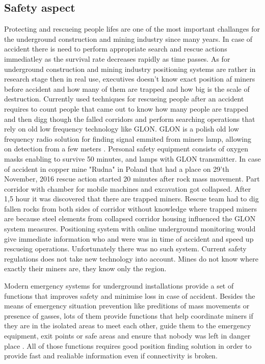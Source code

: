 \documentclass[../main.tex]{subfiles}
\begin{document}
\subsection{Safety aspect} %
\label{sub:safety_aspect}

Protecting and rescueing people lifes are one of the most important challanges for the underground construction and mining industry since many years. In case of accident there is need to perform appropriate search and rescue actions immediatley as the survival rate decreases rapidly as time passes. As for underground construction and mining industry positioning systems are rather in research stage then in real use, executives doesn't know exact position af miners before accident and how many of them are trapped and how big is the scale of destruction. Currently used techniques for rescueing people after an accident requires to count people that came out to know how many people are trapped and then digg though the falled corridors and perform searching operations that rely on old low frequency technology like GLON. GLON is a polish old low frequency radio solution for finding signal emmited from miners lamp, allowing on detection from a few meters \cite{GLON}. Personal safety equipment consists of oxygen masks enabling to survive 50 minutes, and lamps with GLON transmitter. In case of accident in copper mine "Rudna" in Poland that had a place on 29'th November, 2016  \cite{newspaper_rudna} rescue action started 20 minutes after rock mass movement. Part corridor with chamber for mobile machines and excavation got collapsed. After 1,5 hour it was discovered that there are trapped miners. Rescue team had to dig fallen rocks from both sides of corridor without knowledge where trapped miners are because steel elements from collapsed corridor housing influenced the GLON system measures. Positioning system with online underground monitoring would give immediate information who and were was in time of accident and speed up rescueing operations. Unfortunately there was no such system. Current safety regulations does not take new technology into account. Mines do not know where exactly their miners are, they know only the region.

Modern emergency systems for underground installations provide a set of functions that improves safety and minimise loss in case of accident. Besides the means of emergency situation prevention like preditions of mass movements or presence of gasses, lots of them provide functions that help coordinate miners if they are in the isolated areas to meet each other, guide them to the emergency equipment, exit points or safe areas and ensure that nobody was left in danger place \cite{Thesis_CM}. All of those functions requires good position finding solution in order to provide fast and realiable information even if connectivity is broken.
\end{document}
